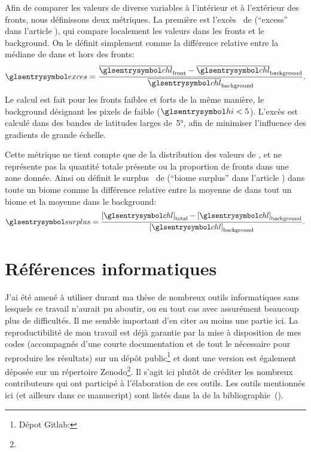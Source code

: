 Afin de comparer les valeurs de diverse variables à l'intérieur et à l'extérieur des fronts, nous définissons deux métriques.
La première est l'excès~ de  (\enquote{excess} dans l'article ), qui compare localement les valeurs dans les fronts et le background. On le définit simplement comme la différence relative entre la médiane de  dans et hors des fronts:
\begin{equation}
  \am{exces} = \frac{\med{\am{chl}}_\frt - \med{\am{chl}}_\bkg}
  {\med{\am{chl}}_\bkg} .
\end{equation}
Le calcul est fait pour les fronts faibles et forts de la même manière, le background désignant les pixels de  faible (\(\am{hi} < 5\)).
L'excès est calculé dans des bandes de latitudes larges de~\ang{5}, afin de minimiser l'influence des gradients de grande échelle.

Cette métrique ne tient compte que de la distribution des valeurs de , et ne représente pas la quantité totale présente ou la proportion de fronts dans une zone donnée.
Ainsi on définit le surplus~ de  (\enquote{biome surplus} dans l'article ) dans toute un biome comme la différence relative entre la moyenne de  dans tout un biome et la moyenne dans le background:
\begin{equation}
  \am{surplus} = \frac{\moy{\am{chl}}_\tot - \moy{\am{chl}}_\bkg}
  {\moy{\am{chl}}_\bkg} .
\end{equation}

\section{Références informatiques}
\label{sec:ref-info}

J'ai été amené à utiliser durant ma thèse de nombreux outils informatiques sans lesquels ce travail n'aurait pu aboutir, ou en tout cas avec assurément beaucoup plus de difficultés.
Il me semble important d'en citer au moins une partie ici.
La reproductibilité de mon travail est déjà garantie par la mise à disposition de mes codes (accompagnés d'une courte documentation et de tout le nécessaire pour reproduire les résultats) sur un dépôt public\footnote{%
  Dépot Gitlab: }
et dont une version est également déposée sur un répertoire Zenodo\footnote{}.
Il s'agit ici plutôt de créditer les nombreux contributeurs qui ont participé à l'élaboration de ces outils. Les outils mentionnés ici (et ailleurs dans ce manuscript) sont listés dans la  de la bibliographie~().

